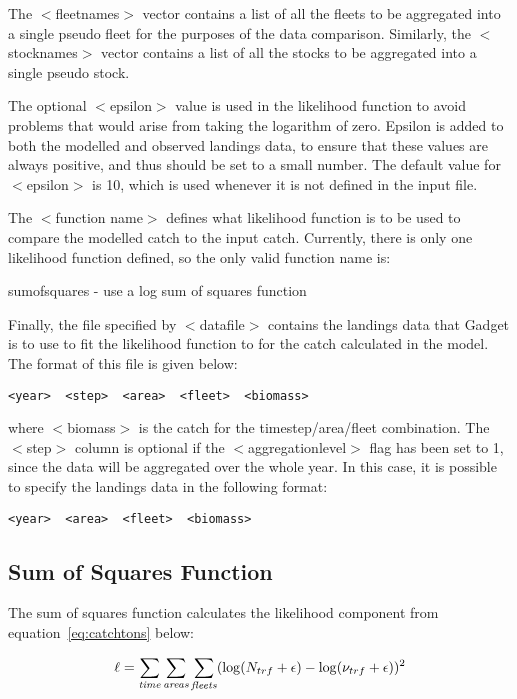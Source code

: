 \documentclass[10pt,twoside]{book}
\begin{document}
\bigskip
The $<$fleetnames$>$ vector contains a list of all the fleets to be aggregated into a single pseudo fleet for the purposes of the data comparison.  Similarly, the $<$stocknames$>$ vector contains a list of all the stocks to be aggregated into a single pseudo stock.

\bigskip
The optional $<$epsilon$>$ value is used in the likelihood function to avoid problems that would arise from taking the logarithm of zero.  Epsilon is added to both the modelled and observed landings data, to ensure that these values are always positive, and thus should be set to a small number.  The default value for $<$epsilon$>$ is 10, which is used whenever it is not defined in the input file.

\bigskip
The $<$function name$>$ defines what likelihood function is to be used to compare the modelled catch to the input catch.  Currently, there is only one likelihood function defined, so the only valid function name is:

\bigskip
sumofsquares - use a log sum of squares function

\bigskip
Finally, the file specified by $<$datafile$>$ contains the landings data that Gadget is to use to fit the likelihood function to for the catch calculated in the model.  The format of this file is given below:

{\small\begin{verbatim}
<year>  <step>  <area>  <fleet>  <biomass>
\end{verbatim}}

where $<$biomass$>$ is the catch for the timestep/area/fleet combination.  The $<$step$>$ column is optional if the $<$aggregationlevel$>$ flag has been set to 1, since the data will be aggregated over the whole year.  In this case, it is possible to specify the landings data in the following format:

{\small\begin{verbatim}
<year>  <area>  <fleet>  <biomass>
\end{verbatim}}

\subsection{Sum of Squares Function}
The sum of squares function calculates the likelihood component from equation~\ref{eq:catchtons} below:

\begin{equation}\label{eq:catchtons}
\ell = \sum_{\it time}\sum_{\it areas}\sum_{\it fleets} (\log(N_{trf} + \epsilon) - \log(\nu_{trf} + \epsilon))^2
\end{equation}
\end{document}
